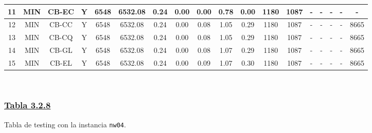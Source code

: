 {\begin{tabular}{ *{17}{c|} c }
\hline
11 & MIN & CB-EC & Y & 6548 & 6532.08 & 0.24 & 0.00 & 0.00 & 0.78 & 0.00 & 1180 & 1087 & - & - & - & - & -\\
\hline
12 & MIN & CB-CC & Y & 6548 & 6532.08 & 0.24 & 0.00 & 0.08 & 1.05 & 0.29 & 1180 & 1087 & - & - & - & - & 8665\\
\hline
13 & MIN & CB-CQ & Y & 6548 & 6532.08 & 0.24 & 0.00 & 0.08 & 1.05 & 0.29 & 1180 & 1087 & - & - & - & - & 8665\\
\hline
14 & MIN & CB-GL & Y & 6548 & 6532.08 & 0.24 & 0.00 & 0.08 & 1.07 & 0.29 & 1180 & 1087 & - & - & - & - & 8665\\
\hline
15 & MIN & CB-EL & Y & 6548 & 6532.08 & 0.24 & 0.00 & 0.09 & 1.07 & 0.30 & 1180 & 1087 & - & - & - & - & 8665\\
\hline
\end{tabular}\\
\vspace{4mm}
}

\subsubsection*{\underline{Tabla 3.2.8}}
\noindent Tabla de testing con la instancia \verb_nw04_.\\

